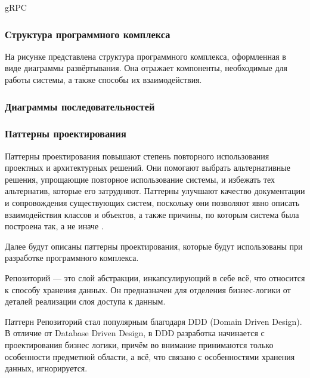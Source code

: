 


gRPC



\subsubsection{Структура программного комплекса}

На рисунке представлена структура программного комплекса, оформленная в виде диаграммы развёртывания. Она отражает компоненты, необходимые для работы системы, а также способы их взаимодействия. 



\subsubsection{Диаграммы последовательностей}



\subsubsection{Паттерны проектирования}

Паттерны проектирования повышают степень повторного использования проектных и архитектурных решений. Они помогают выбрать альтернативные решения, упрощающие повторное использование системы, и избежать тех альтернатив, которые его затрудняют. Паттерны улучшают качество документации и сопровождения существующих систем, поскольку они позволяют явно описать взаимодействия классов и объектов, а также причины, по которым система была построена так, а не иначе \cite{patterns}.

Далее будут описаны паттерны проектирования, которые будут использованы при разработке программного комплекса.



Репозиторий \cite{repository_pattern} --- это слой абстракции, инкапсулирующий в себе всё, что относится к способу хранения данных. Он предназначен для отделения бизнес-логики от деталей реализации слоя доступа к данным.

Паттерн Репозиторий стал популярным благодаря DDD (Domain Driven Design). В отличие от Database Driven Design, в DDD разработка начинается с проектирования бизнес логики, причём во внимание принимаются только особенности предметной области, а всё, что связано с особенностями хранения данных, игнорируется.

